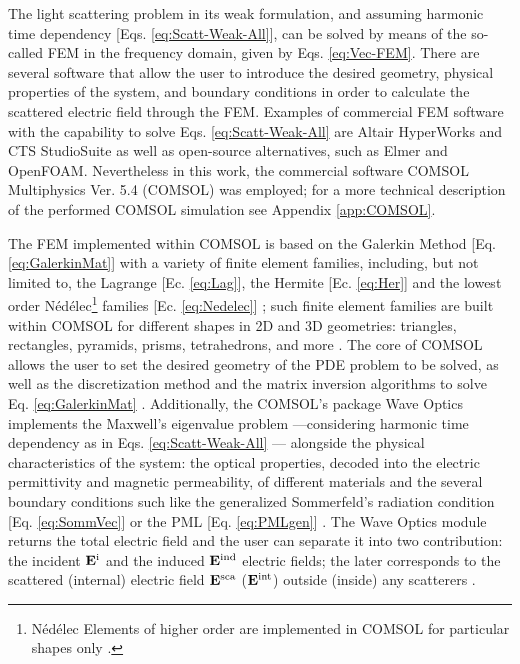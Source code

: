 
The light scattering problem in its weak formulation, and assuming harmonic time dependency [Eqs. \eqref{eq:Scatt-Weak-All}], can be solved by means of the so-called FEM in the frequency domain, given by Eqs. \eqref{eq:Vec-FEM}. There are several software that allow the user to introduce the desired geometry, physical properties of the system, and boundary conditions in order to calculate the scattered electric field through the FEM. Examples of commercial FEM software with the capability to solve Eqs. \eqref{eq:Scatt-Weak-All} are Altair HyperWorks and CTS StudioSuite as well as open-source alternatives, such as Elmer and OpenFOAM. Nevertheless in this work, the commercial software COMSOL Multiphysics\texttrademark{} Ver. 5.4 (COMSOL) was employed; for a more technical description of the performed COMSOL simulation see Appendix \ref{app:COMSOL}.

The FEM implemented within COMSOL is based on the Galerkin Method [Eq. \eqref{eq:GalerkinMat}] with a variety of finite element families, including, but not limited to, the Lagrange [Ec. \eqref{eq:Lag}], the Hermite [Ec. \eqref{eq:Her}] and the lowest order Nédélec\footnote{Nédélec Elements of higher order are implemented in COMSOL for particular shapes only \cite{comsol_doc}.} families [Ec. \eqref{eq:Nedelec}] \cite{comsol_doc}; such finite element families are built within COMSOL for different shapes in 2D and 3D geometries: triangles, rectangles, pyramids,  prisms, tetrahedrons, and more \cite{comsol_doc}. The core of COMSOL allows the user to set the desired geometry of the PDE problem to be solved, as well as the discretization method and the matrix inversion algorithms to solve Eq. \eqref{eq:GalerkinMat} \cite{comsol_doc}. Additionally, the COMSOL's package Wave Optics implements the Maxwell's eigenvalue problem ---considering harmonic time dependency as in Eqs. \eqref{eq:Scatt-Weak-All} \cite{comsol_doc}--- alongside the physical characteristics of the system: the optical properties, decoded into the electric permittivity and magnetic permeability, of different materials and the several boundary conditions such like the generalized Sommerfeld's radiation condition [Eq. \eqref{eq:SommVec}] or the PML [Eq. \eqref{eq:PMLgen}] \cite{comsol_wave}. The Wave Optics module returns the total electric field and the user can separate it into two contribution: the incident  $\vb{E}^\text{i}$ and the induced  $\vb{E}^\text{ind}$ electric fields; the later corresponds to the scattered (internal) electric field  $\vb{E}^\text{sca}$ ($\vb{E}^\text{int}$) outside (inside) any scatterers \cite{comsol_wave}.

